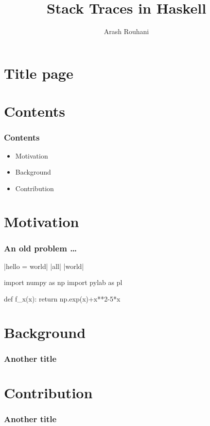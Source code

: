 \documentclass[11pt]{beamer} %
\title{Stack Traces in Haskell}
\author[Arash Rouhani]{Arash Rouhani} %
\institute{Chalmers University of Technology}
\begin{document}


\section{Title page} %
\begin{frame}[plain]
 \titlepage
\end{frame}

\section{Contents}
\begin{frame}
 \frametitle{Contents}
\begin{itemize}
 \item Motivation
 \item Background
 \item Contribution
\end{itemize}
\end{frame}

\section{Motivation}
\begin{frame}
 \frametitle{An old problem \dots}
  |hello = world|
  |all|
  |world|
\begin{pythoncode}
    import numpy as np
    import pylab as pl

    def f_x(x):
      return np.exp(x)+x**2-5*x
    
\end{pythoncode}
\end{frame}

\section{Background}
\begin{frame}
 \frametitle{Another title}
\end{frame}

\section{Contribution}
\begin{frame}
 \frametitle{Another title}
\end{frame}
\end{document}
